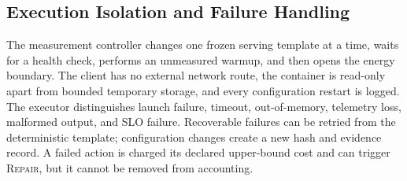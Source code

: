 \subsection{Execution Isolation and Failure Handling}

The measurement controller changes one frozen serving template at a time,
waits for a health check, performs an unmeasured warmup, and then opens the
energy boundary.  The client has no external network route, the container is
read-only apart from bounded temporary storage, and every configuration restart
is logged.  The executor distinguishes launch failure, timeout, out-of-memory,
telemetry loss, malformed output, and SLO failure.  Recoverable failures can be
retried from the deterministic template; configuration changes create a new
hash and evidence record.  A failed action is charged its declared upper-bound
cost and can trigger \textsc{Repair}, but it cannot be removed from accounting.
